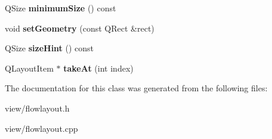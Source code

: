 \begin{DoxyCompactItemize}
\item 
\hypertarget{classFlowLayout_a6e28537828ad1c477a299df5bc156212}{Q\+Size {\bfseries minimum\+Size} () const }\label{classFlowLayout_a6e28537828ad1c477a299df5bc156212}

\item 
\hypertarget{classFlowLayout_aa33b32ad4916b86b062d427860952d1e}{void {\bfseries set\+Geometry} (const Q\+Rect \&rect)}\label{classFlowLayout_aa33b32ad4916b86b062d427860952d1e}

\item 
\hypertarget{classFlowLayout_a7d52617e64c908d68dc1c75fbb549325}{Q\+Size {\bfseries size\+Hint} () const }\label{classFlowLayout_a7d52617e64c908d68dc1c75fbb549325}

\item 
\hypertarget{classFlowLayout_a55dad3061f24ea01069d6496e55d4aab}{Q\+Layout\+Item $\ast$ {\bfseries take\+At} (int index)}\label{classFlowLayout_a55dad3061f24ea01069d6496e55d4aab}

\end{DoxyCompactItemize}


The documentation for this class was generated from the following files\+:\begin{DoxyCompactItemize}
\item 
view/flowlayout.\+h\item 
view/flowlayout.\+cpp\end{DoxyCompactItemize}
